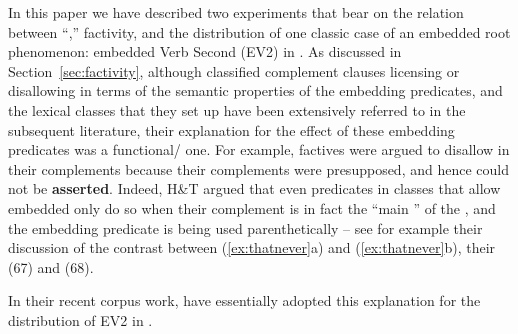 \documentclass[output=paper]{langsci/langscibook}
\begin{document}
In this paper we have described two experiments that bear on the relation between ``,'' factivity, and the distribution of one classic case of an embedded root phenomenon: embedded Verb Second (EV2) in . As discussed in Section~\ref{sec:factivity}, although \citet{HooperThompson1973}  classified complement clauses licensing or disallowing  in terms of the semantic properties of the embedding predicates, and the lexical classes that they set up have been extensively referred to in the subsequent literature, their explanation for the effect of these embedding predicates was a functional/ one. For example, factives were argued to disallow  in their complements because their complements were presupposed, and hence could not be \textbf{asserted}. Indeed, H\&T argued that even predicates in classes that allow embedded  only do so when their complement is in fact the ``main '' of the , and the embedding predicate is being used parenthetically -- see for example their discussion of the contrast between (\ref{ex:thatnever}a) and (\ref{ex:thatnever}b), their (67) and (68).%



\noindent In their recent corpus work, \citet{JensenChristensen2013} have essentially adopted this explanation for the distribution of EV2 in .
\end{document}
